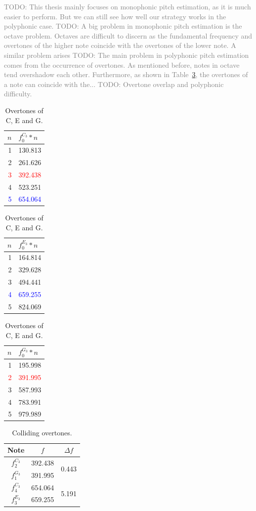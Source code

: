 \documentclass[a4paper,10pt,twocolumn]{article}
\begin{document}
\textcolor{gray}{TODO: This thesis mainly focuses on monophonic pitch estimation, as it is much easier to perform. But we can still see how well our strategy works in the polyphonic case.
TODO: A big problem in monophonic pitch estimation is the octave problem. Octaves are difficult to discern as the fundamental frequency and overtones of the higher note coincide with the overtones of the lower note. A similar problem arises
TODO: The main problem in polyphonic pitch estimation comes from the occurrence of overtones. As mentioned before, notes in octave tend overshadow each other. Furthermore, as shown in Table~\ref{tab:overtones}, the overtones of a note can coincide with the...
TODO: Overtone overlap and polyphonic difficulty.}
\begin{table}[h]
    \centering
    \hfill
    \begin{tabular}{r|l}
        $n$ & $f^{C_3}_0*n$ \\
        \hline
        1 & 130.813 \\
        2 & 261.626 \\
        \textcolor{red}{3} & \textcolor{red}{392.438} \\
        4 & 523.251 \\
        \textcolor{blue}{5} & \textcolor{blue}{654.064}
    \end{tabular}
    \hfill
    \begin{tabular}{r|l}
        $n$ & $f^{E_3}_0*n$ \\
        \hline
        1 & 164.814 \\
        2 & 329.628 \\
        3 & 494.441 \\
        \textcolor{blue}{4} & \textcolor{blue}{659.255} \\
        5 & 824.069
    \end{tabular}
    \hfill
    \begin{tabular}{r|l}
        $n$ & $f^{G_3}_0*n$ \\
        \hline
        1 & 195.998 \\
        \textcolor{red}{2} & \textcolor{red}{391.995} \\
        3 & 587.993 \\
        4 & 783.991 \\
        5 & 979.989
    \end{tabular}
    \hfill
    \caption{Overtones of C, E and G.}
    \label{tab:overtones}
\end{table}
\begin{table}[h]
    \centering
    \begin{tabular}{c|c|c}
        Note & $f$ & $\Delta f$ \\
        \hline
        $f^{C_3}_2$ & 392.438 & \multirow{2}{*}{0.443} \\
        $f^{G_3}_1$ & 391.995 & \\
        \hline
        $f^{C_3}_4$ & 654.064 & \multirow{2}{*}{5.191} \\
        $f^{E_3}_3$ & 659.255 &
    \end{tabular}
    \caption{Colliding overtones.}
    \label{tab:diff}
\end{table}
\end{document}
